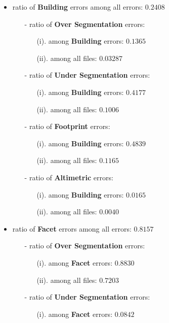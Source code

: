 \documentclass[a4paper, 11pt]{article}
\begin{document}
	\begin{itemize}
		\item ratio of \textbf{Building} errors among all errors: $0.2408$
		\begin{itemize}
			\item[-] ratio of \textbf{Over Segmentation} errors:
			\begin{itemize}
				\item[(i).] among \textbf{Building} errors:  $0.1365$
				\item[(ii).] among all files:  $0.03287$
			\end{itemize}
			\item[-] ratio of \textbf{Under Segmentation} errors:
			\begin{itemize}
				\item[(i).] among \textbf{Building} errors:  $0.4177$
				\item[(ii).] among all files:   $0.1006$
			\end{itemize}
			\item[-] ratio of \textbf{Footprint} errors:
			\begin{itemize}
				\item[(i).] among \textbf{Building} errors:  $0.4839$
				\item[(ii).] among all files:  $0.1165$
			\end{itemize}
			\item[-] ratio of \textbf{Altimetric} errors:
			\begin{itemize}
				\item[(i).] among \textbf{Building} errors:  $0.0165$
				\item[(ii).] among all files:  $0.0040$
			\end{itemize}
		\end{itemize}
		\item ratio of \textbf{Facet} errors among all errors: $0.8157$
		\begin{itemize}
			\item[-] ratio of \textbf{Over Segmentation} errors:
			\begin{itemize}
				\item[(i).] among \textbf{Facet} errors:  $0.8830$
				\item[(ii).] among all files:  $0.7203$
			\end{itemize}
			\item[-] ratio of \textbf{Under Segmentation} errors:
			\begin{itemize}
				\item[(i).] among \textbf{Facet} errors:  $0.0842$

\end{itemize}
\end{itemize}
\end{itemize}
\end{document}
